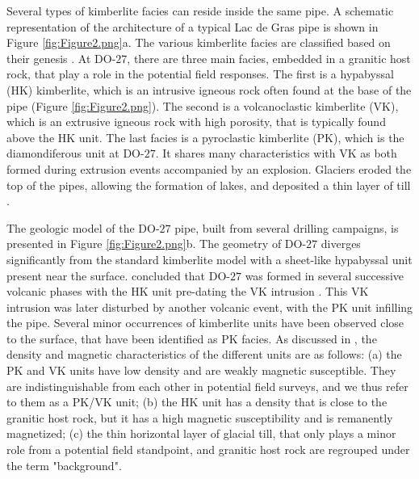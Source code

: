 \documentclass[paper, twocolumn]{geophysics} %
\begin{document}
Several types of kimberlite facies can reside inside the same pipe. A schematic representation of the architecture of a typical Lac de Gras pipe is shown in Figure \ref{fig:Figure2.png}a. The various kimberlite facies are classified based on their genesis \citep{KimberliteModel0,KimberliteModel1}. At DO-$27$, there are three main facies, embedded in a granitic host rock, that play a role in the potential field responses. The first is a hypabyssal (HK) kimberlite, which is an intrusive igneous rock often found at the base of the pipe (Figure \ref{fig:Figure2.png}). The second is a volcanoclastic kimberlite (VK), which is an extrusive igneous rock with high porosity, that is typically found above the HK unit. The last facies is a pyroclastic kimberlite (PK), which is the diamondiferous unit at DO-$27$. It shares many characteristics with VK as both formed during extrusion events accompanied by an explosion. Glaciers eroded the top of the pipes, allowing the formation of lakes, and deposited a thin layer of till \citep{Dyke,Doyle}.

The geologic model of the DO-$27$ pipe, built from several drilling campaigns, is presented in Figure \ref{fig:Figure2.png}b. The geometry of DO-$27$ diverges significantly from the standard kimberlite model with a sheet-like hypabyssal unit present near the surface. \citet{HARDER2009} concluded that DO-$27$ was formed in several successive volcanic phases with the HK unit pre-dating the VK intrusion \citep{Doyle}. This VK intrusion was later disturbed by another volcanic event, with the PK unit infilling the pipe. Several minor occurrences of kimberlite units have been observed close to the surface, that have been identified as PK facies. As discussed in \citet{TKCpaper}, the density and magnetic characteristics of the different units are as follows: (a) the PK and VK units have low density and are weakly magnetic susceptible. They are indistinguishable from each other in potential field surveys, and we thus refer to them as a PK/VK unit; (b) the HK unit has a density that is close to the granitic host rock, but it has a high magnetic susceptibility and is remanently magnetized; (c) the thin horizontal layer of glacial till, that only plays a minor role from a potential field standpoint, and granitic host rock are regrouped under the term "background".

\end{document}
